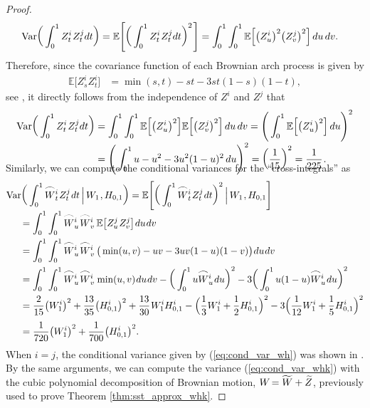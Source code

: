 \documentclass[sn-mathphys-num]{sn-jnl}%
\newcommand{\E}{\mathbb{E}}
\newcommand{\m}{\hspace{0.25mm}}
\newcommand{\mm}{\hspace{5mm}}
\newcommand{\var}{\mathrm{Var}}
\begin{document}
\begin{proof}
\begin{align*}
\var\bigg(\int_0^1 Z_t^i\m Z_t^j dt\bigg) & = \E\Bigg[\bigg(\int_0^1 Z_t^i\m Z_t^j dt\bigg)^2\m\Bigg] = \int_0^1\int_0^1 \E\Big[\big(Z_u^i\big)^2\big(Z_v^j\big)^2\Big]\, du\, dv.
\end{align*}
Therefore, since the covariance function of each Brownian arch process is given by
\begin{align*}
\E\big[Z_s^i Z_t^i\big] & = \min(s,t) - st - 3st(1-s)(1-t),
\end{align*}
see \cite[Definition 3.4]{foster2020poly}, it directly follows from the independence of $Z^i$ and $Z^j$ that
\begin{align*}
\var\bigg(\int_0^1 Z_t^i\m Z_t^j dt\bigg) & = \int_0^1\int_0^1 \E\Big[\big(Z_u^i\big)^2\Big]\E\Big[\big(Z_v^j\big)^2\Big]\, du\, dv = \Bigg(\int_0^1 \E\Big[\big(Z_u^i\big)^2\Big]\, du\Bigg)^2\\[-3pt]
& = \Bigg(\int_0^1 u - u^2 - 3u^2(1-u)^2\,du\Bigg)^2 = \bigg(\frac{1}{15}\bigg)^2 = \frac{1}{225}\m.\\[-20pt]
\end{align*}
Similarly, we can compute the conditional variances for the ``cross-integrals'' as
\begin{align*}
& \var\bigg(\int_0^1 \wideparen{W}_t^i\m Z_t^j\m dt\, \Big|\, W_1\m, H_{0,1}\bigg) =  \E\Bigg[\bigg(\int_0^1 \wideparen{W}_t^i\m Z_t^j\m dt\bigg)^2\, \Big|\, W_1\m, H_{0,1}\Bigg]\\[-3pt]
&\mm = \int_0^1\int_0^1 \wideparen{W}_u^i\m \wideparen{W}_v^i\,\E\big[Z_u^j\m Z_v^j\big]\m du\m dv\\
&\mm = \int_0^1\int_0^1 \wideparen{W}_u^i\m \wideparen{W}_v^i\,\big(\min(u,v) - uv - 3uv(1-u)(1-v)\big)\m du\m dv\\
&\mm = \int_0^1\int_0^1 \wideparen{W}_u^i\m \wideparen{W}_v^i\m\min(u,v) \m du\m dv - \bigg(\int_0^1 u\wideparen{W}_u^i\m du\bigg)^2 - 3\bigg(\int_0^1 u(1-u)\wideparen{W}_u^i\m du\bigg)^2\\
&\mm = \frac{2}{15}\big(W_1^i\big)^2  + \frac{13}{35}\big(H_{0,1}^i\big)^2 + \frac{13}{30}\m W_1^i H_{0,1}^i - \Big(\frac{1}{3}W_1^i + \frac{1}{2}H_{0,1}^i\Big)^2 - 3\Big(\frac{1}{12}W_1^i + \frac{1}{5}H_{0,1}^i\Big)^2\\[3pt]
&\mm = \frac{1}{720}\big(W_1^i\big)^2 + \frac{1}{700}\big(H_{0,1}^i\big)^2.
\end{align*}
When $i=j$, the conditional variance given by (\ref{eq:cond_var_wh}) was shown in \cite[Theorem 3.10]{foster2020poly}.
By the same arguments, we can compute the variance (\ref{eq:cond_var_whk}) with the cubic polynomial decomposition of Brownian motion, $W\hspace{-0.45mm} = \widetilde{W} + \widetilde{Z}$, previously used to prove Theorem \ref{thm:sst_approx_whk}.

\end{proof}
\end{document}
